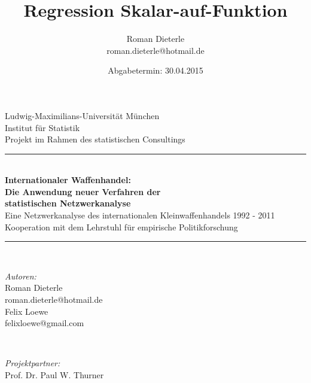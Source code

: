 \documentclass[a4paper,ngerman,oneside,titlepage,11pt]{scrreprt}
\title{Regression Skalar-auf-Funktion}
\date{Abgabetermin: 30.04.2015}
\author{Roman Dieterle\\roman.dieterle@hotmail.de}
\theoremstyle{remark}
\begin{document}
\begin{titlepage}

\newcommand{\HRule}{\rule{\linewidth}{0.5mm}} %

\center %
 

\LARGE Ludwig-Maximilians-Universität München\\[0.2cm] %
\LARGE Institut für Statistik\\[5mm]%
\large Projekt im Rahmen des statistischen Consultings\\[6mm]


\HRule \\[0.4cm]
{ \huge \bfseries Internationaler Waffenhandel:\\ Die Anwendung neuer Verfahren der\\ statistischen Netzwerkanalyse}\\[5mm]
{ Eine Netzwerkanalyse des internationalen Kleinwaffenhandels 1992 - 2011}\\
{ Kooperation mit dem Lehrstuhl für empirische Politikforschung}\\[0.4cm] %
\HRule \\[1.5cm]
 

\begin{minipage}[t]{0.4\textwidth}
\begin{flushleft} \large
\emph{Autoren:}\\[2mm]
Roman Dieterle\\
roman.dieterle@hotmail.de\\[5mm]

Felix Loewe\\
felixloewe@gmail.com\\%
\end{flushleft}
\end{minipage}
~
\begin{minipage}[t]{0.4\textwidth}
\begin{flushright} \large
\emph{Projektpartner:}\\[2mm]
Prof. Dr. Paul W. Thurner\\[6mm]


\end{flushright}
\end{minipage}
\end{titlepage}
\end{document}
